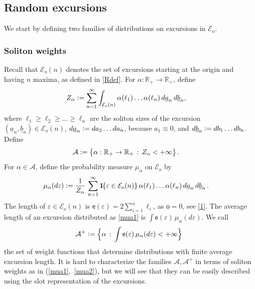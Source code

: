 \documentclass[12pt]{article}
\numberwithin{equation}{section}
\newcommand{\RR}{\mathbb R}
\newcommand{\cA}{\mathcal A}
\newcommand{\cE}{\mathcal E}
\newcommand{\se}{{\mathsf{e}}}
\newcommand{\so}{{\mathsf{o}}}
\newcommand{\ua}{\underline a}
\newcommand{\ub}{\underline b}
\newcommand{\one}{{\bf 1}\hskip-.5mm} %
\newcommand{\vep}{\varepsilon}
\begin{document}
\subsection{Random excursions}
\label{2.6}

We start by defining two families of distributions on excursions in $\cE_o$.

\subsubsection{Soliton weights}
\label{2.6.1}

Recall that $\cE_o(n)$ denotes the set of excursions starting at the origin and having $n$ maxima, as defined in \eqref{Rdef}.
For $\alpha:\RR_+\to \RR_+$, define
\begin{align}
  \label{za3}
  Z_\alpha&\vcentcolon = \sum_{n=1}^\infty\int_{\cE_o(n)}\alpha(\ell_1)\dots\alpha(\ell_n)\, d \ua_n\, d\ub_{n},
\end{align}
where $\ell_1\geq \ell_2\geq  \dots \geq \ell_n$ are the soliton sizes of the excursion $(\ua_n, \ub_{n})\in\cE_o(n)$,  $d\ua_n \vcentcolon = da_2\dots da_n$, because $a_1\equiv0$, and $ d\ub_{n}\vcentcolon =db_1\dots db_n$. Define
\begin{align}\label{mua0}
  	\mathcal A&\vcentcolon =\bigl\{\alpha:\RR_+\to \RR_+\,:\, Z_\alpha<+\infty\bigr\}\,.
\end{align}
For $\alpha \in\cA$,
define the probability measure $\mu_\alpha$ on $\cE_o$ by
\begin{align}
	\label{mua1}
	\mu_\alpha(d\varepsilon)
  &\vcentcolon =\frac{1}{Z_\alpha}\, \sum_{n=1}^\infty\one\{\vep\in\cE_o(n)\}\, \alpha(\ell_1)\dots\alpha(\ell_n)\, d\ua_n\, d\ub_{n}\,.
    \end{align}
The length of $\vep\in\cE_o(n)$ is $\se(\vep)=2\sum_{i=1}^{n}\ell_i$, as $\so=0$, see \eqref{1}. The average length of an excursion distributed as \eqref{mua1} is $\int \se(\varepsilon)\,\mu_\alpha(d\varepsilon)$. We call
\begin{equation}
	\label{mua2}
	\mathcal A^+\vcentcolon =\Bigl\{\alpha\,:\,\int \se(\varepsilon)\,\mu_\alpha(d\varepsilon)< +\infty\Bigr\}\,
\end{equation}
the set of weight functions that determine distributions with finite average excursion length.
It is hard to characterize the families $\mathcal A, \mathcal A^+$ in terms of soliton weights as in (\ref{mua1},~\ref{mua2}), but we will see that they can be easily described using the slot representation of the excursions. 
\end{document}

